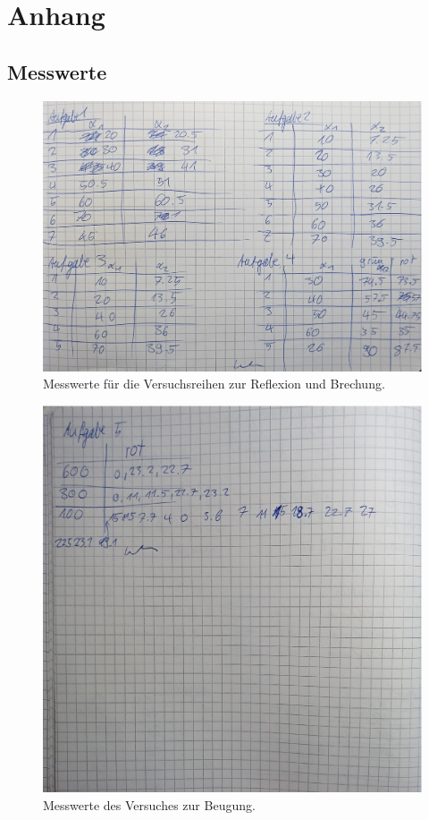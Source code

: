 \section{Anhang}
\subsection{Messwerte}

\begin{figure}
    \centering
    \includegraphics[width=\textwidth]{anhang1.pdf}
    \caption{Messwerte für die Versuchsreihen zur Reflexion und Brechung.}
\end{figure}

\begin{figure}
    \centering
    \includegraphics[width=\textwidth]{anhang2.pdf}
    \caption{Messwerte des Versuches zur Beugung.}
\end{figure}